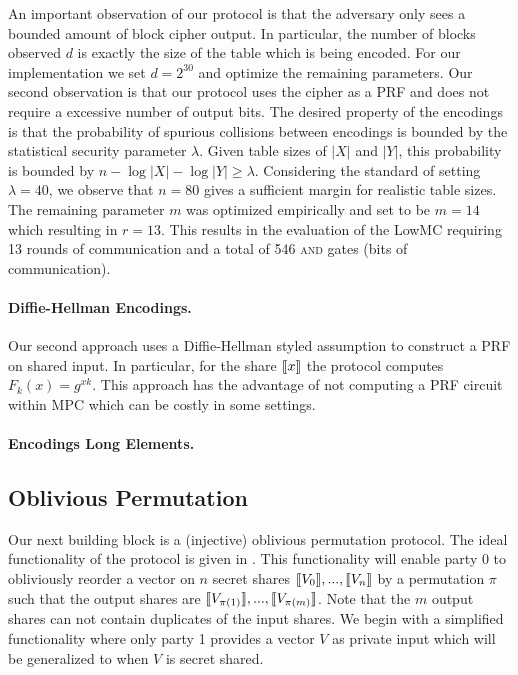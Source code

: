 An important observation of our protocol is that the adversary only sees a bounded amount of block cipher output. In particular, the number of blocks observed $d$ is exactly the size of the table which is being encoded. For our implementation we set $d=2^{30}$ and optimize the remaining parameters. Our second observation is that our protocol uses the cipher as a PRF and does not require a excessive number of output bits. The desired property of the encodings is that the probability of spurious collisions between encodings is bounded by the statistical security parameter $\lambda$. Given table sizes of $|X|$ and $|Y|$, this probability is bounded by $n-\log |X|-\log |Y|\geq \lambda$. Considering the standard of setting $\lambda=40$, we observe that $n=80$ gives a sufficient margin for realistic table sizes. The remaining parameter $m$ was optimized empirically and set to be $m=14$ which resulting in $r=13$. This results in the evaluation of the LowMC requiring 13 rounds of communication and a total of 546 \textsc{and} gates (bits of communication).



\paragraph{Diffie-Hellman Encodings.} Our second approach uses a Diffie-Hellman styled assumption to construct a PRF on shared input. In particular, for the share $\llbracket x\rrbracket$ the protocol computes $F_k(x) = g^{xk}$. This approach has the advantage of not computing a PRF circuit within MPC which can be costly in some settings.




\paragraph{Encodings Long Elements.}


\subsection{Oblivious Permutation}

Our next building block is a (injective) oblivious permutation protocol. The ideal functionality of the protocol is given in . This functionality will enable party 0 to obliviously reorder a vector on $n$ secret shares $\llbracket V_0\rrbracket,...,\llbracket V_n\rrbracket$ by a permutation $\pi$ such that the output shares are $\llbracket V_{\pi(1)}\rrbracket,...,\llbracket V_{\pi(m)}\rrbracket$. Note that the $m$ output shares can not contain duplicates of the input shares. We begin with a simplified functionality where only party 1 provides a vector $V$ as private input which will be generalized to when $V$ is secret shared.


